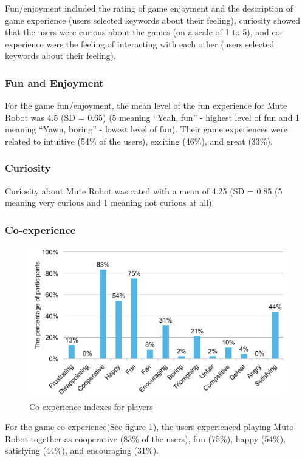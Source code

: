 \documentclass{sigchi}
\begin{document}
Fun/enjoyment included the rating of game enjoyment and the description of game experience (users selected keywords about their feeling), curiosity showed that the users were curious about the games (on a scale of 1 to 5), and co-experience were the feeling of interacting with each other (users selected keywords about their feeling).

\subsubsection{Fun and Enjoyment}
For the game fun/enjoyment, the mean level of the fun experience for Mute Robot was 4.5 (SD = 0.65) (5 meaning “Yeah, fun” - highest level of fun and 1 meaning “Yawn, boring” - lowest level of fun). Their game experiences were related to intuitive (54\% of the users), exciting (46\%), and great (33\%). 

\subsubsection{Curiosity}
Curiosity about Mute Robot was rated with a mean of 4.25 (SD = 0.85 (5 meaning very curious and 1 meaning not curious at all).

\subsubsection{Co-experience}

\begin{figure}[!h]
\centering
\includegraphics[width=1.0\columnwidth]{Figures/US_F1.pdf}
\caption{Co-experience indexes for players}
\label{fig:US_F1}
\end{figure}

For the game co-experience(See figure \ref{fig:US_F1}), the users experienced playing Mute Robot together as cooperative (83\% of the users), fun (75\%), happy (54\%), satisfying (44\%), and encouraging (31\%). 
\end{document}
